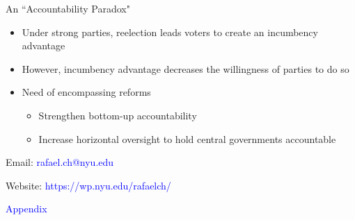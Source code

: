 \documentclass{beamer}
\begin{document}
\begin{frame}[label=paradox]{An ``Accountability Paradox"}

\begin{itemize}
 		  \setlength\itemsep{1em}   	

	\item Under strong parties, reelection leads voters to create an incumbency advantage
	\item \alert{However}, incumbency advantage decreases the willingness of parties to do so
	\item Need of encompassing reforms
	\begin{itemize}
	\item Strengthen bottom-up accountability 
	\item Increase horizontal oversight to hold central governments accountable 
	\end{itemize}
	
\end{itemize} 
	 
\end{frame}
\begin{frame}[label=contact, noframenumbering]
	\centering
	
	Email: \textcolor{blue}{rafael.ch@nyu.edu}
	
	\bigskip
	
	Website: \textcolor{blue}{https://wp.nyu.edu/rafaelch/}

	
\end{frame}
 

\begin{frame}[label=appendix, noframenumbering]
	\centering
	
	\textcolor{blue}{Appendix}
	
\end{frame}
 
\end{document}
